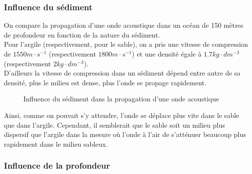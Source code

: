 \documentclass{rapportECC}
\begin{document}
\subsubsection{Influence du sédiment}
On  compare la propagation d'une onde acoustique dans un océan de 150 mètres de profondeur en fonction de la nature du sédiment. \\
Pour l'argile (respectivement, pour le sable), on a pris une vitesse de compression de $1550 m \cdot s^{-1}$ (respectivement $1800 m \cdot s^{-1}$)  et une densité égale à $1.7 kg \cdot dm^{-3}$ (respectivement $2 kg \cdot dm^{-3}$).
\\
D'ailleurs la vitesse de compression dans un sédiment dépend entre autre de sa densité, plus le milieu est dense, plus l'onde se propage rapidement.
\begin{figure}[H]
    \centering
    \label{fig:image1}\hfill
    \caption{Influence du sédiment dans la propagation d'une onde acoustique}
    \label{fig:images_cote_a_cote}
\end{figure}
Ainsi, comme on pouvait s'y attendre, l'onde se déplace plus vite dans le sable que dans l'argile. Cependant, il semblerait que le sable soit un milieu plus dispersif que l'argile dans la mesure où l'onde à l'air de s'atténuer beaucoup plus rapidement dans le milieu sableux.

\subsubsection{Influence de la profondeur}
\end{document}
